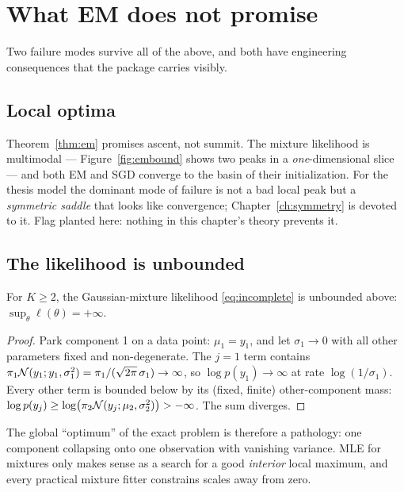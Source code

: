 \section{What EM does not promise}\label{sec:empathology}

Two failure modes survive all of the above, and both have engineering
consequences that the package carries visibly.

\subsection{Local optima}

Theorem~\ref{thm:em} promises ascent, not summit. The mixture likelihood
is multimodal --- Figure~\ref{fig:embound} shows two peaks in a
\emph{one}-dimensional slice --- and both EM and SGD converge to the basin
of their initialization. For the thesis model the dominant mode of failure
is not a bad local peak but a \emph{symmetric saddle} that looks like
convergence; Chapter~\ref{ch:symmetry} is devoted to it. Flag planted
here: nothing in this chapter's theory prevents it.

\subsection{The likelihood is unbounded}

\begin{proposition}\label{prop:spike}
For $K \ge 2$, the Gaussian-mixture likelihood \eqref{eq:incomplete} is
unbounded above: $\sup_\theta \ell(\theta) = +\infty$.
\end{proposition}

\begin{proof}
Park component 1 on a data point: $\mu_1 = y_1$, and let
$\sigma_1 \to 0$ with all other parameters fixed and non-degenerate. The
$j = 1$ term contains $\pi_1 \mathcal{N}(y_1; y_1, \sigma_1^2) =
\pi_1 / (\sqrt{2\pi}\,\sigma_1) \to \infty$, so
$\log p(y_1) \to \infty$ at rate $\log(1/\sigma_1)$. Every other term is
bounded below by its (fixed, finite) other-component mass:
$\log p(y_j) \ge \log\bigl(\pi_2 \mathcal{N}(y_j; \mu_2, \sigma_2^2)\bigr) >
-\infty$. The sum diverges.
\end{proof}

The global ``optimum'' of the exact problem is therefore a pathology: one
component collapsing onto one observation with vanishing variance. MLE for
mixtures only makes sense as a search for a good \emph{interior} local
maximum, and every practical mixture fitter constrains scales away from
zero.

